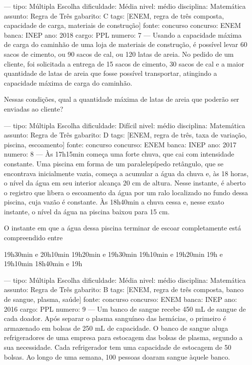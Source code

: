 ---
tipo: Múltipla Escolha
dificuldade: Média
nivel: médio
disciplina: Matemática
assunto: Regra de Três
gabarito: C
tags: [ENEM, regra de três composta, capacidade de carga, materiais de construção]
fonte: concurso
concurso: ENEM
banca: INEP
ano: 2018
cargo: PPL
numero: 7
---
\question
Usando a capacidade máxima de carga do caminhão de uma loja de materiais de construção, é possível levar 60 sacos de cimento, ou 90 sacos de cal, ou 120 latas de areia. No pedido de um cliente, foi solicitada a entrega de 15 sacos de cimento, 30 sacos de cal e a maior quantidade de latas de areia que fosse possível transportar, atingindo a capacidade máxima de carga do caminhão.

Nessas condições, qual a quantidade máxima de latas de areia que poderão ser enviadas ao cliente?
\begin{choices}
\end{choices}

---
tipo: Múltipla Escolha
dificuldade: Difícil
nivel: médio
disciplina: Matemática
assunto: Regra de Três
gabarito: D
tags: [ENEM, regra de três, taxa de variação, piscina, escoamento]
fonte: concurso
concurso: ENEM
banca: INEP
ano: 2017
numero: 8
---
\question
Às 17h15min começa uma forte chuva, que cai com intensidade constante. Uma piscina em forma de um paralelepípedo retângulo, que se encontrava inicialmente vazia, começa a acumular a água da chuva e, às 18 horas, o nível da água em seu interior alcança 20 cm de altura. Nesse instante, é aberto o registro que libera o escoamento da água por um ralo localizado no fundo dessa piscina, cuja vazão é constante. Às 18h40min a chuva cessa e, nesse exato instante, o nível da água na piscina baixou para 15 cm.

O instante em que a água dessa piscina terminar de escoar completamente está compreendido entre
\begin{choices}
\choice 19h30min e 20h10min
\choice 19h20min e 19h30min
\choice 19h10min e 19h20min
\CorrectChoice 19h e 19h10min
\choice 18h40min e 19h
\end{choices}

---
tipo: Múltipla Escolha
dificuldade: Média
nivel: médio
disciplina: Matemática
assunto: Regra de Três
gabarito: B
tags: [ENEM, regra de três composta, banco de sangue, plasma, saúde]
fonte: concurso
concurso: ENEM
banca: INEP
ano: 2016
cargo: PPL
numero: 9
---
\question
Um banco de sangue recebe 450 mL de sangue de cada doador. Após separar o plasma sanguíneo das hemácias, o primeiro é armazenado em bolsas de 250 mL de capacidade. O banco de sangue aluga refrigeradores de uma empresa para estocagem das bolsas de plasma, segundo a sua necessidade. Cada refrigerador tem uma capacidade de estocagem de 50 bolsas. Ao longo de uma semana, 100 pessoas doaram sangue àquele banco.

